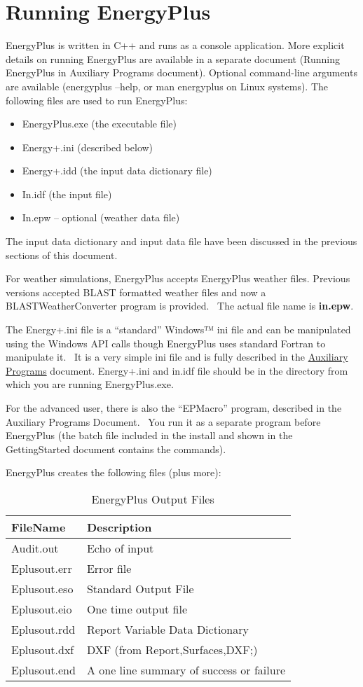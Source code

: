 \chapter{Running EnergyPlus}\label{running-energyplus}

EnergyPlus is written in C++ and runs as a console application. More explicit details on running EnergyPlus are available in a separate document (Running EnergyPlus in Auxiliary Programs document). Optional command-line arguments are available (energyplus --help, or man energyplus on Linux systems). The following files are used to run EnergyPlus:

\begin{itemize}
\item
  EnergyPlus.exe (the executable file)
\item
  Energy+.ini (described below)
\item
  Energy+.idd (the input data dictionary file)
\item
  In.idf (the input file)
\item
  In.epw -- optional (weather data file)
\end{itemize}

The input data dictionary and input data file have been discussed in the previous sections of this document.

For weather simulations, EnergyPlus accepts EnergyPlus weather files. Previous versions accepted BLAST formatted weather files and now a BLASTWeatherConverter program is provided.~ The actual file name is \textbf{in.epw}.

The Energy+.ini file is a ``standard'' Windows™ ini file and can be manipulated using the Windows API calls though EnergyPlus uses standard Fortran to manipulate it.~ It is a very simple ini file and is fully described in the \href{file:///E:/Docs4PDFs/AuxiliaryPrograms.pdf}{Auxiliary Programs} document. Energy+.ini and in.idf file should be in the directory from which you are running EnergyPlus.exe.

For the advanced user, there is also the ``EPMacro'' program, described in the Auxiliary Programs Document.~ You run it as a separate program before EnergyPlus (the batch file included in the install and shown in the GettingStarted document contains the commands).

EnergyPlus creates the following files (plus more):

\begin{longtable}[c]{@{}ll@{}}
\caption{  EnergyPlus Output Files \protect \label{table:energyplus-output-files}}\\
\toprule 
FileName & Description \tabularnewline \midrule
\endhead
Audit.out & Echo of input \tabularnewline
Eplusout.err & Error file \tabularnewline
Eplusout.eso & Standard Output File \tabularnewline
Eplusout.eio & One time output file \tabularnewline
Eplusout.rdd & Report Variable Data Dictionary \tabularnewline
Eplusout.dxf & DXF (from Report,Surfaces,DXF;) \tabularnewline
Eplusout.end & A one line summary of success or failure \tabularnewline
\bottomrule
\end{longtable}

